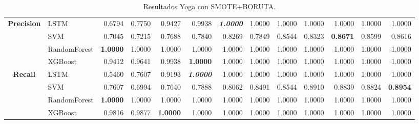 \begin{table}[H]
\begin{adjustbox}{max width=14cm}
\begin{tabular}{|c|l|r|r|r|r|r|r|r|r|r|r|r|}
			\hline
			\textbf{Precision} &  LSTM &  0.6794 &  0.7750 &  0.9427 &  0.9938 & \textit{ \textbf{  1.0000 } } &  1.0000 &  1.0000 &  1.0000 &  1.0000 &  1.0000 &  1.0000 \\
			&  SVM &  0.7045 &  0.7215 &  0.7688 &  0.7840 &  0.8269 &  0.7849 &  0.8544 &  0.8323 & \textbf{  0.8671 } &  0.8599 &  0.8616 \\
			&  RandomForest & \textbf{  1.0000 } &  1.0000 &  1.0000 &  1.0000 &  1.0000 &  1.0000 &  1.0000 &  1.0000 &  1.0000 &  1.0000 &  1.0000 \\
			&  XGBoost &  0.9412 &  0.9641 &  0.9938 & \textbf{  1.0000 } &  1.0000 &  1.0000 &  1.0000 &  1.0000 &  1.0000 &  1.0000 &  1.0000 \\
			\hline
			\textbf{Recall} &  LSTM &  0.5460 &  0.7607 &  0.9193 & \textit{ \textbf{  1.0000 } } &  1.0000 &  1.0000 &  1.0000 &  1.0000 &  1.0000 &  1.0000 &  1.0000 \\
			&  SVM &  0.7607 &  0.6994 &  0.7640 &  0.7888 &  0.8062 &  0.8491 &  0.8544 &  0.8910 &  0.8839 &  0.8824 & \textbf{  0.8954 } \\
			&  RandomForest & \textbf{  1.0000 } &  1.0000 &  1.0000 &  1.0000 &  1.0000 &  1.0000 &  1.0000 &  1.0000 &  1.0000 &  1.0000 &  1.0000 \\
			&  XGBoost &  0.9816 &  0.9877 & \textbf{  1.0000 } &  1.0000 &  1.0000 &  1.0000 &  1.0000 &  1.0000 &  1.0000 &  1.0000 &  1.0000 \\
			\hline
		\end{tabular}
	\end{adjustbox}
	\caption{Resultados Yoga con SMOTE+BORUTA.}
	\label{tab:Yoga_SMOTE_BORUTA}
\end{table}
